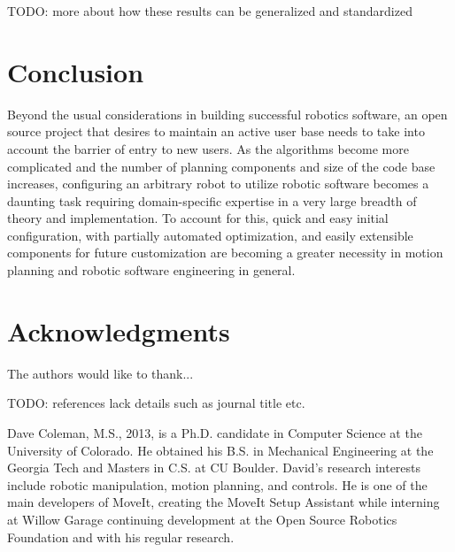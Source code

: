 \documentclass[10pt,journal,compsoc]{joser1}
\begin{document}
{TODO: more about how these results can be generalized and standardized

\section{Conclusion}
\label{sec::conclusion}

Beyond the usual considerations in building successful robotics software, an open source project that desires to maintain an active user base needs to take into account the barrier of entry to new users. As the algorithms become more complicated and the number of planning components and size of the code base increases, configuring an arbitrary robot to utilize robotic software becomes a daunting task requiring domain-specific expertise in a very large breadth of theory and implementation. To account for this, quick and easy initial configuration, with partially automated optimization, and easily extensible components for future customization are becoming a greater necessity in motion planning and robotic software engineering in general. 

\section*{Acknowledgments}
The authors would like to thank...

TODO: references lack details such as journal title etc. 





\begin{IEEEbiography}[{coleman}]{Dave Coleman}, M.S., 2013, is a Ph.D. candidate in Computer Science at the University of Colorado. He obtained his B.S. in Mechanical Engineering at the Georgia Tech and Masters in C.S. at CU Boulder. David's research interests include robotic manipulation, motion planning, and controls. He is one of the main developers of MoveIt, creating the MoveIt Setup Assistant while interning at Willow Garage continuing development at the Open Source Robotics Foundation and with his regular research.
\end{IEEEbiography}

}
\end{document}
